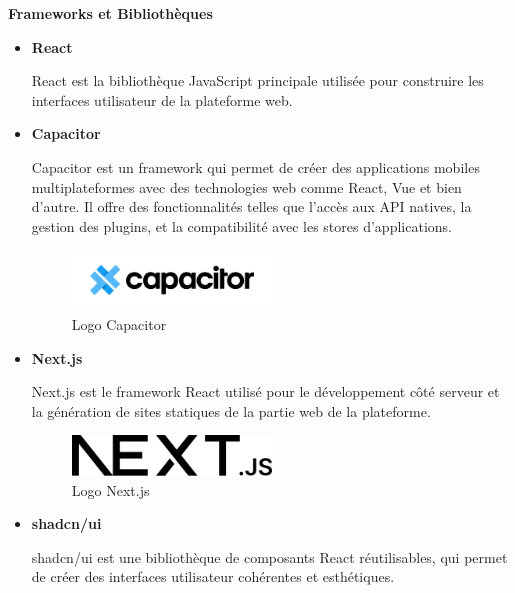 \textbf{Frameworks et Bibliothèques}
\begin{itemize}
  \item \textbf{React}

    React est la bibliothèque JavaScript principale utilisée pour construire
    les interfaces utilisateur de la plateforme web.

  \item \textbf{Capacitor}

    Capacitor est un framework qui permet de créer des applications mobiles
    multiplateformes avec des technologies web comme React,  Vue et bien d'autre.
    Il offre des fonctionnalités telles que l'accès aux API natives, la gestion
    des plugins, et la compatibilité avec les stores d'applications.

    \begin{figure}[H]
      \centering
      \includegraphics[width=0.5\textwidth]{images/Capacitor-JS-2375506976.png}
      \caption{Logo Capacitor}
    \end{figure}

  \item \textbf{Next.js}

    Next.js est le framework React utilisé pour le développement côté serveur
    et la génération de sites statiques de la partie web de la plateforme.

    \begin{figure}[H]
      \centering
      \includegraphics[width=0.5\textwidth]{images/Nextjs-logo.svg.png}
      \caption{Logo Next.js}
    \end{figure}


  \item \textbf{shadcn/ui}

    shadcn/ui est une bibliothèque de composants React réutilisables, qui
    permet de créer des interfaces utilisateur cohérentes et esthétiques.
\end{itemize}

